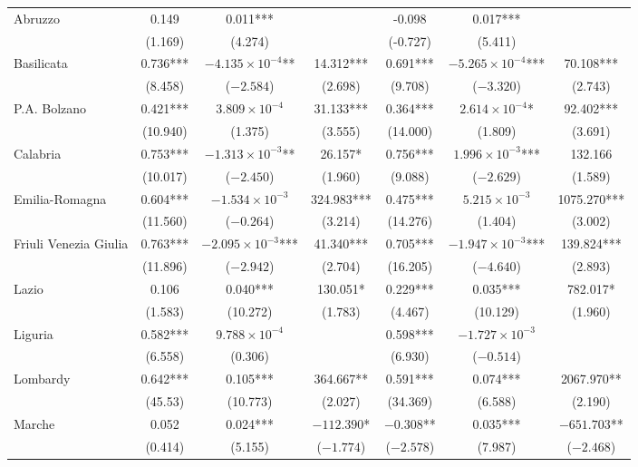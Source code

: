 \documentclass[12pt]{article}
\begin{document}
\begin{appendices}
\begin{longtable}{@{}lcccccc@{}}
            Abruzzo & 0.149 & 0.011*** &  & -0.098 & 0.017*** &  \\ 
             & (1.169) & (4.274) &  & (-0.727) & (5.411) &  \\ 
            Basilicata & 0.736*** & $-4.135 \times 10^{-4}$** & 14.312*** & 0.691*** & $-5.265 \times 10^{-4}$*** & 70.108*** \\ 
             & (8.458) & ($-2.584$) & (2.698) & (9.708) & ($-3.320$) & (2.743) \\ 
            P.A. Bolzano & 0.421*** & $3.809 \times 10^{-4}$ & 31.133*** & 0.364*** & $2.614 \times 10^{-4}$* & 92.402*** \\ 
             & (10.940) & (1.375) & (3.555) & (14.000) & (1.809) & (3.691) \\ 
            Calabria & 0.753*** & $-1.313 \times 10^{-3}$** & 26.157* & 0.756*** & $1.996 \times 10^{-3}$*** & 132.166 \\ 
             & (10.017) & ($-2.450$) & (1.960) & (9.088) & ($-2.629$) & (1.589) \\ 
            Emilia-Romagna & 0.604*** & $-1.534 \times 10^{-3}$ & 324.983*** & 0.475*** & $5.215 \times 10^{-3}$ & 1075.270*** \\ 
             & (11.560) & ($-0.264$) & (3.214) & (14.276) & (1.404) & (3.002) \\ 
            Friuli Venezia Giulia & 0.763*** & $-2.095 \times 10^{-3}$*** & 41.340*** & 0.705*** & $-1.947 \times 10^{-3}$*** & 139.824*** \\ 
             & (11.896) & ($-2.942$) & (2.704) & (16.205) & ($-4.640$) & (2.893) \\ 
            Lazio & 0.106 & 0.040*** & 130.051* & 0.229*** & 0.035*** & 782.017* \\ 
             & (1.583) & (10.272) & (1.783) & (4.467) & (10.129) & (1.960) \\ 
            Liguria & 0.582*** & $9.788 \times 10^{-4}$ &  & 0.598*** & $-1.727 \times 10^{-3}$ &  \\ 
             & (6.558) & (0.306) &  & (6.930) & ($-0.514$) &  \\ 
            Lombardy & 0.642*** & 0.105*** & 364.667** & 0.591*** & 0.074*** & 2067.970** \\ 
             & (45.53) & (10.773) & (2.027) & (34.369) & (6.588) & (2.190) \\ 
            Marche & 0.052 & 0.024*** & $-112.390$* & $-0.308$** & 0.035*** & $-651.703$** \\ 
             & (0.414) & (5.155) & ($-1.774$) & ($-2.578$) & (7.987) & ($-2.468$) \\ 

\end{longtable}
\end{appendices}
\end{document}
